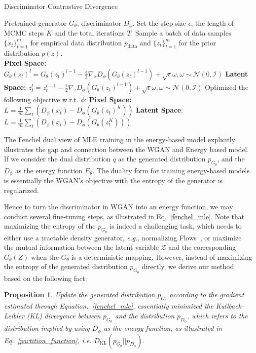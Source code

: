 \documentclass{article}
\newtheorem{proposition}{Proposition}
\newcommand{\KL}{D_{\mathrm{KL}}}
\begin{document}
\begin{algorithm}[t]
  \caption{Discriminator Contrastive Divergence}
  \label{DCD}
  \begin{algorithmic}[1]
   Pretrained generator $G_\theta$, discriminator $D_\phi$.
  \STATE Set the step size $\epsilon$, the length of MCMC steps $K$ and the total iterations $T$.
  \STATE Sample a batch of data samples $\{x_t\}_{t=1}^{m}$ for empirical data distribution $p_{\text{data}}$ and $\{z_t\}_{t=1}^{m}$ for the prior distribution $p(z)$.\\
     \STATE \textbf{Pixel Space:} $G_\theta(z_t)^l = G_\theta(z_t)^{l-1} -\frac{\epsilon}{2} \nabla_{x} D_{\phi}\left(G_\theta(z_t)^{l-1}\right)+\sqrt{\epsilon}\omega, \omega \sim \mathcal{N}(0, \mathcal{I})$ \OR
     \STATE \textbf{Latent Space:} $z_t^l = z_t^{l-1} -\frac{\epsilon}{2} \nabla_{z} D_{\phi}\left(G_\theta(z_t)^{l-1}\right)+\sqrt{\epsilon}\omega, \omega \sim \mathcal{N}(0, \mathcal{I})$
   \ENDFOR
   \STATE Optimized the following objective w.r.t. $\phi$:
   \STATE \textbf{Pixel Space:} $L = \frac{1}{m}\sum_{t}(D_\phi(x_t)-D_\phi(G_\theta(z_t)^K))$ \OR
   \STATE \textbf{Latent Space}: $L = \frac{1}{m}\sum_{t}(D_\phi(x_t)-D_\phi(G_\theta(z_t^K)))$
  \ENDFOR
\end{algorithmic}
\end{algorithm}

The Fenchel dual view of MLE training in the energy-based model explicitly illustrates the gap and connection between the WGAN and Energy based model. If we consider the dual distribution $q$ as the generated distribution $p_{G_\theta}$, and the $D_\phi$ as the energy function $E_\theta$. The duality form for training energy-based models is essentially the WGAN's objective with the entropy of the generator is regularized.

Hence to turn the discriminator in WGAN into an energy function, we may conduct several fine-tuning steps, as illustrated in Eq.~\ref{fenchel_mle}. Note that maximizing the entropy of the $p_{G_\theta}$ is indeed a challenging task, which needs to either use a tractable density generator, \emph{e.g.}, normalizing Flows~\cite{realnvp}, or maximize the mutual information between the latent variable $\mathcal{Z}$ and the corresponding $G_\theta (Z)$ when the $G_\theta$ is a deterministic mapping. However, instead of maximizing the entropy of the generated distribution $p_{G_\theta}$ directly, we derive our method based on the following fact: 
\begin{proposition}\cite{kim2016deep}\label{prop1}
    Update the generated distribution $p_{G_\theta}$ according to the gradient estimated through Equation.~\ref{fenchel_mle}, essentially minimized the Kullback–Leibler (KL) divergence between $p_{G_\theta}$ and the distribution $p_{D_\phi}$, which refers to the distribution implied by using $D_\phi$ as the energy function, as illustrated in Eq.~\ref{partition_function}, \emph{i.e.} $\KL(p_{G_\theta}||p_{D_\phi})$.
\end{proposition}
\end{document}
